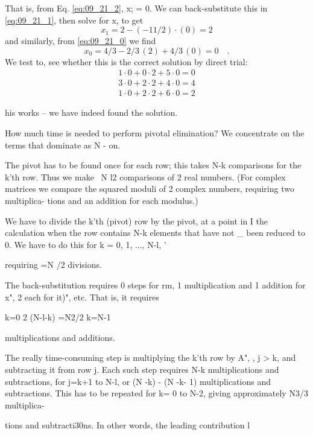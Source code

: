 That is, from Eq. \ref{eq:09_21_2}, x; = 0. We can back-substitute this in  \ref{eq:09_21_1},
then solve for x, to get
\begin{equation*}
    x_1 = 2 - (-11/2)\cdot(0) = 2
\end{equation*} 
and similarly, from \ref{eq:09_21_0} we find
\begin{equation*}
x_0 = 4/3 - 2/3\,(2)+4/3\,(0) = 0 \quad .
\end{equation*} 
We test to, see whether this is the correct solution by direct trial:
\begin{eqnarray*} 
1 \cdot 0+0 \cdot 2+5 \cdot 0=0\\
3 \cdot 0+2 \cdot 2+4 \cdot 0=4\\
1 \cdot 0+2 \cdot 2+6 \cdot 0=2
\end{eqnarray*} 

his works -- we have indeed found the solution.


How much time is needed to perform pivotal elimination? We
concentrate on the terms that dominate as N - on.

The pivot has to be found once for each row; this takes N-k
comparisons for the k'th row. Thus we make ~N l2 comparisons
of 2 real numbers. (For complex matrices we compare the
squared moduli of 2 complex numbers, requiring two multiplica-
tions and an addition for each modulus.)

We have to divide the k'th (pivot) row by the pivot, at a point in I
the calculation when the row contains N-k elements that have not \_
been reduced to 0. We have to do this for k = 0, 1, ..., N-l, '

requiring =N /2 divisions.

The back-substitution requires 0 steps for rm, 1 multiplication
and 1 addition for x", 2 each for it)", etc. That is, it requires

k=0
2 (N-l-k) =N2/2
k=N-1

multiplications and additions.

The really time-consuming step is multiplying the k'th row by
A", , j > k, and subtracting it from row j. Each such step requires
N-k multiplications and subtractions, for j=k+1 to N-l, or
(N -k) - (N -k- 1) multiplications and subtractions. This has to be
repeated for k= 0 to N-2, giving approximately N3/3 multiplica-

 


 

tions and subtracti30ns. In other words, the leading contribution l

